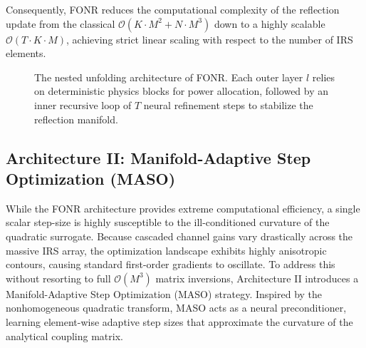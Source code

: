 \documentclass[journal]{IEEEtran}
\begin{document}
Consequently, FONR reduces the computational complexity of the reflection update from the classical $\mathcal{O}(K \cdot M^2 + N \cdot M^3)$ down to a highly scalable $\mathcal{O}(T \cdot K \cdot M)$, achieving strict linear scaling with respect to the number of IRS elements.
\begin{figure}[!t]
\centering
{}
\caption{The nested unfolding architecture of FONR. Each outer layer $l$ relies on deterministic physics blocks for power allocation, followed by an inner recursive loop of $T$ neural refinement steps to stabilize the reflection manifold.}
\label{fig:nested_fonr}
\end{figure}

\subsection{Architecture II: Manifold-Adaptive Step Optimization (MASO)}
\label{subsec:maso}

While the FONR architecture provides extreme computational efficiency, a single scalar step-size is highly susceptible to the ill-conditioned curvature of the quadratic surrogate. Because cascaded channel gains vary drastically across the massive IRS array, the optimization landscape exhibits highly anisotropic contours, causing standard first-order gradients to oscillate. To address this without resorting to full $\mathcal{O}(M^3)$ matrix inversions, Architecture II introduces a Manifold-Adaptive Step Optimization (MASO) strategy. Inspired by the nonhomogeneous quadratic transform, MASO acts as a neural preconditioner, learning element-wise adaptive step sizes that approximate the curvature of the analytical coupling matrix.
\end{document}
